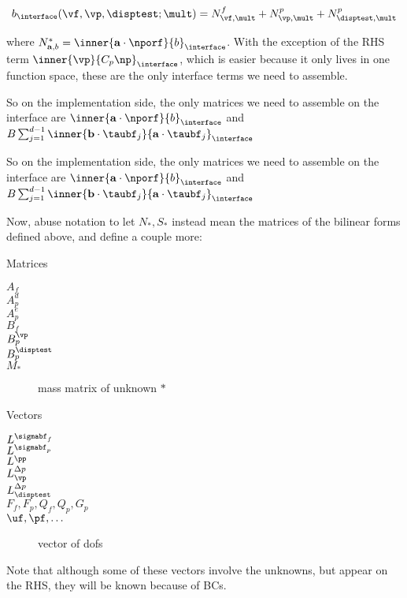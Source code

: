 \documentclass{article}
\begin{document}
$$b_{\interface}(\vf, \vp, \disptest; \mult) = N^f_{\vf, \mult} + N^p_{\vp, \mult} + N^p_{\disptest, \mult} $$

where $N^*_{\mathbf{a}, b} = \inner{\mathbf{a} \cdot \nporf}{b}_{\interface}$. With the exception of the RHS term $\inner{\vp}{C_p\np}_{\interface}$, which is easier because it only lives in one function space, these are the only interface terms we need to assemble.

So on the implementation side, the only matrices we need to assemble on the interface are $\inner{\mathbf{a} \cdot \nporf}{b}_{\interface}$ and  $B \sum_{j=1}^{d-1} \inner{\mathbf{b} \cdot \taubf_j}{\mathbf{a} \cdot \taubf_j}_{\interface}$

So on the implementation side, the only matrices we need to assemble on the interface are $\inner{\mathbf{a} \cdot \nporf}{b}_{\interface}$ and  $B \sum_{j=1}^{d-1} \inner{\mathbf{b} \cdot \taubf_j}{\mathbf{a} \cdot \taubf_j}_{\interface}$

Now, abuse notation to let $N_*, S_*$ instead mean the matrices of the bilinear forms defined above, and define a couple more:
\begin{center}
  \begin{multicols}{2}
    Matrices
\begin{description}
\item[$A_f$]  {}
\item[$A^d_p$]  {}
\item[$A^e_p$]  {}
\item[$B_f$]  {}
\item[$B^{\vp}_p$]  {}
\item[$B^{\disptest}_p$]  {}
\item[$M_*$]  mass matrix of unknown $* $
\end{description}
\columnbreak
Vectors
\begin{description}
\item[$L^{\sigmabf_f}$]  {}
\item[$L^{\sigmabf_p}$]  {}
\item[$L^{\pp}$]  \matrixform{\inner{\pp \np}{\vp}_{\darcybdy}}
\item[$L_{\vp}^{\Delta p}$]  {}
\item[$L_{\disptest}^{\Delta p}$]  {}
\item[$F_f, F_p, Q_f, Q_p, G_p$]  {}
\item[$\uf, \pf, \ldots$]  vector of dofs
  
\end{description}

\end{multicols}
\end{center}
Note that although some of these vectors involve the unknowns, but appear on the RHS, they will be known because of BCs.
\end{document}
